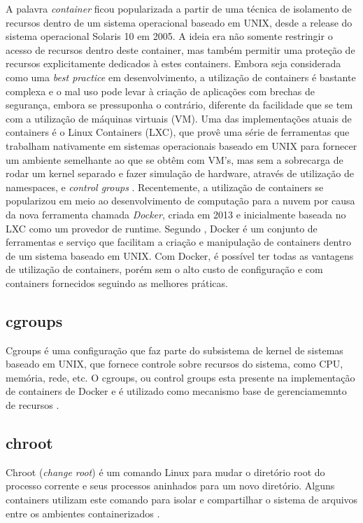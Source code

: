 \documentclass[twoside,english,brazilian]{UNISINOSmonografia}
\begin{document}
A palavra \textit{container} ficou popularizada a partir de uma técnica de isolamento de recursos dentro de um sistema operacional baseado em UNIX, desde a release do sistema operacional Solaris 10 em 2005. A ideia era não somente restringir o acesso de recursos dentro deste container, mas também permitir uma proteção de recursos explicitamente dedicados à estes containers. Embora seja considerada como uma \textit{best practice} em desenvolvimento, a utilização de containers é bastante complexa e o mal uso pode levar à criação de aplicações com brechas de segurança, embora se pressuponha o contrário, diferente da facilidade que se tem com a utilização de máquinas virtuais (VM). Uma das implementações atuais de containers é o Linux Containers (LXC), que provê uma série de ferramentas que trabalham nativamente em sistemas operacionais baseado em UNIX para fornecer um ambiente semelhante ao que se obtêm com VM's, mas sem a sobrecarga de rodar um kernel separado e fazer simulação de hardware, através de utilização de namespaces, e \textit{control groups} \cite{LXC2016}.
Recentemente, a utilização de containers se popularizou em meio ao desenvolvimento de computação para a nuvem por causa da nova ferramenta chamada \textit{Docker}, criada em 2013 e inicialmente baseada no LXC como um provedor de runtime. Segundo \cite{NICKOLOFF2016}, Docker é um conjunto de ferramentas e serviço que facilitam a criação e manipulação de containers dentro de um sistema baseado em UNIX. Com Docker, é possível ter todas as vantagens de utilização de containers, porém sem o alto custo de configuração e com containers fornecidos seguindo as melhores práticas. 

\subsection{cgroups}
Cgroups é uma configuração que faz parte do subsistema de kernel de sistemas baseado em UNIX, que fornece controle sobre recursos do sistema, como CPU, memória, rede, etc. O cgroups, ou control groups esta presente na implementação de containers de Docker e é utilizado como mecanismo base de gerenciamemnto de recursos \cite{NICKOLOFF2016}.

\subsection{chroot}
Chroot (\textit{change root}) é um comando Linux para mudar o diretório root do processo corrente e seus processos aninhados para um novo diretório. Alguns containers utilizam este comando para isolar e compartilhar o sistema de arquivos entre os ambientes containerizados \cite{Dua2014}. 
\end{document}
